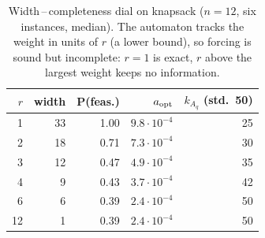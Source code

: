 \begin{table}[t]\centering\small\setlength{\tabcolsep}{4pt}
\caption{ Width\,--\,completeness dial on knapsack ($n=12$, six instances, median). The automaton tracks the weight in units of $r$ (a lower bound), so forcing is sound but incomplete: $r=1$ is exact, $r$ above the largest weight keeps no information.}\label{tab:gen_relax}
\begin{tabular}{rrrrr}\toprule
$r$ & width & P(feas.) & $a_{\rm opt}$ & $k_{A_q}$ (std.\ 50)\\\midrule
1 & 33 & 1.00 & $9.8\!\cdot\!10^{-4}$ & 25\\
2 & 18 & 0.71 & $7.3\!\cdot\!10^{-4}$ & 30\\
3 & 12 & 0.47 & $4.9\!\cdot\!10^{-4}$ & 35\\
4 & 9 & 0.43 & $3.7\!\cdot\!10^{-4}$ & 42\\
6 & 6 & 0.39 & $2.4\!\cdot\!10^{-4}$ & 50\\
12 & 1 & 0.39 & $2.4\!\cdot\!10^{-4}$ & 50\\
\bottomrule\end{tabular}\end{table}
